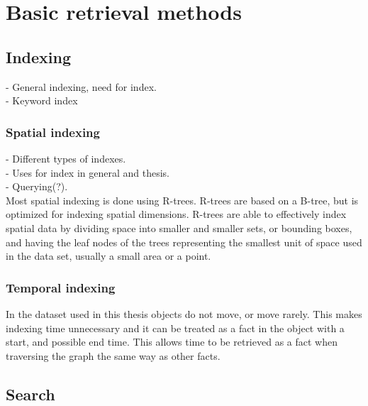 
\chapter{Basic retrieval methods}

\section{Indexing}

- General indexing, need for index.\\
- Keyword index\\

\subsection{Spatial indexing}
- Different types of indexes.\\
- Uses for index in general and thesis.\\
- Querying(?).\\
Most spatial indexing is done using R-trees. R-trees are based on a B-tree, but is optimized for indexing spatial dimensions. R-trees are able to effectively index spatial data by dividing space into smaller and smaller sets, or bounding boxes, and having the leaf nodes of the trees representing the smallest unit of space used in the data set, usually a small area or a point.\\

\subsection{Temporal indexing}
In the dataset used in this thesis objects do not move, or move rarely. This makes indexing time unnecessary and it can be treated as a fact in the object with a start, and possible end time. This allows time to be retrieved as a fact when traversing the graph the same way as other facts.\\

\section{Search}
